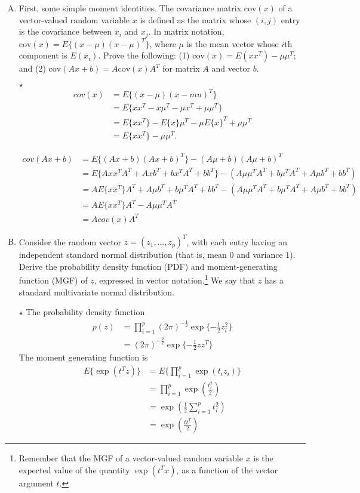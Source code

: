 \documentclass[11pt]{article}
\newcommand{\jie}{$\star$ }
\newcommand{\half}{\frac{1}{2}}
\begin{document}
\begin{enumerate}[(A)]

\item First, some simple moment identities.  The covariance matrix $\mbox{cov}(x)$ of a vector-valued random variable $x$ is defined as the matrix whose $(i,j)$ entry is the covariance between $x_i$ and $x_j$.  In matrix notation, $\mbox{cov}(x) = E\{ (x - \mu) (x - \mu)^T \}$, where $\mu$ is the mean vector whose $i$th component is $E(x_i)$.  Prove the following: (1) $\mbox{cov}(x) = E(xx^T) - \mu \mu^T$; and (2) $\mbox{cov}(Ax + b) = A \mbox{cov}(x) A^T$ for matrix $A$ and vector $b$.

\bigskip

\jie
\begin{align*}
    cov(x) &= E\{ (x-\mu)(x-mu)^T\} \\
    &= E\{xx^T - x\mu^T -\mu x^T + \mu \mu^T \} \\
    &= E\{xx^T\} - E\{x\}\mu^T - \mu E\{x\}^T + \mu \mu^T \\
    &= E\{xx^T\} - \mu \mu^T.
\end{align*}

\begin{align*}
    cov(Ax+b) &= E\{(Ax+b)(Ax+b)^T\} - (A\mu+b)(A\mu+b)^T \\
    &= E\{Axx^TA^T + Axb^T + bx^TA^T + bb^T\} - (A\mu\mu^TA^T + b\mu^TA^T + A\mu b^T +bb^T) \\
    &= A E\{xx^T\}A^T + A\mu b^T + b\mu^TA^T +bb^T - (A\mu\mu^TA^T + b\mu^TA^T + A\mu b^T +bb^T) \\
    &= A E\{xx^T\}A^T - A\mu \mu^T A^T \\
    &= A cov(x) A^T
\end{align*}

\bigskip

\item Consider the random vector $z = (z_1, \ldots, z_p)^T$, with each entry having an independent standard normal distribution (that is, mean 0 and variance 1).  Derive the probability density function (PDF) and moment-generating function (MGF) of $z$, expressed in vector notation.\footnote{Remember that the MGF of a vector-valued random variable $x$ is the expected value of the quantity $\exp(t^T x)$, as a function of the vector argument $t$.}   We say that $z$ has a standard multivariate normal distribution.

\bigskip

\jie
The probability density function
\begin{align*}
    p(z) &= \prod_{i=1}^p (2\pi)^{-\frac{1}{2}} \exp \{-\half z_i^2\} \\
    &= (2\pi)^{-\frac{p}{2}} \exp \{ -\half zz^T\}
\end{align*}
The moment generating function is
\begin{align*}
    E\{\exp(t^Tz)\} &= E\{\prod_{i=1}^p \exp(t_iz_i)\} \\
    &= \prod_{i=1}^p \exp(\frac{t_i^2}{2}) \\
    &= \exp (\half \sum_{i=1}^p t_i^2) \\
    &= \exp(\frac{tt^T}{2})
\end{align*}


\end{enumerate}
\end{document}
